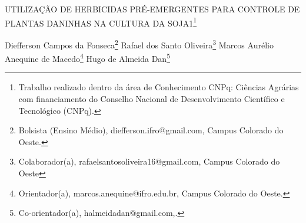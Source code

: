 \documentclass[article,12pt,onesidea,4paper,english,brazil]{abntex2}
\begin{document}
	
	
	\frenchspacing 
	
	\begin{center}
		\LARGE UTILIZAÇÃO DE HERBICIDAS PRÉ-EMERGENTES PARA CONTROLE DE
		PLANTAS DANINHAS NA CULTURA DA SOJA1\footnote{Trabalho realizado dentro da área de Conhecimento CNPq: Ciências Agrárias com financiamento do
			Conselho Nacional de Desenvolvimento Científico e Tecnológico (CNPq).}
		
		\normalsize
		Diefferson Campos da Fonseca\footnote{Bolsista (Ensino Médio), diefferson.ifro@gmail.com, Campus Colorado do Oeste.} 
	Rafael dos Santo Oliveira\footnote{Colaborador(a), rafaelsantosoliveira16@gmail.com, Campus Colorado do Oeste} 
	Marcos Aurélio Anequine de Macedo\footnote{Orientador(a), marcos.anequine@ifro.edu.br, Campus Colorado do Oeste.} 
		Hugo de Almeida Dan\footnote{Co-orientador(a), halmeidadan@gmail.com,.} 
	\end{center}
	
\end{document}
